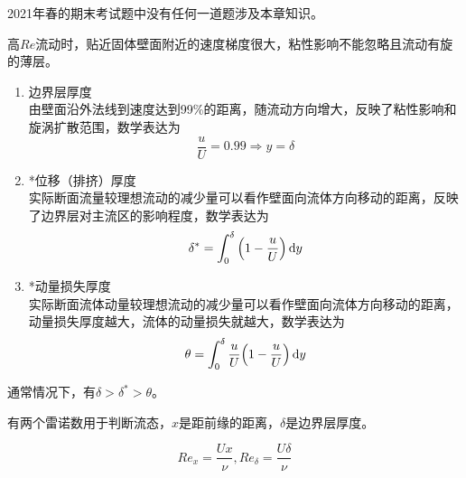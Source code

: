 
\begin{tip}
	2021年春的期末考试题中没有任何一道题涉及本章知识。
\end{tip}


\begin{definition}[边界层]
	高$Re$流动时，贴近固体壁面附近的速度梯度很大，粘性影响不能忽略且流动有旋的薄层。
\end{definition}


\begin{enumerate}
	\item 边界层厚度\\
	由壁面沿外法线到速度达到99\%的距离，随流动方向增大，反映了粘性影响和旋涡扩散范围，数学表达为
	\begin{equation}
		\dfrac{u}{U} = 0.99 \Rightarrow y = \delta
	\end{equation}
    \item *位移（排挤）厚度\\
    实际断面流量较理想流动的减少量可以看作壁面向流体方向移动的距离，反映了边界层对主流区的影响程度，数学表达为
    \begin{equation}
    	\delta^{*} = \int_{0}^{\delta} \qty(1 - \dfrac{u}{U}) \dd{y}
    \end{equation}
    \item *动量损失厚度\\
    实际断面流体动量较理想流动的减少量可以看作壁面向流体方向移动的距离，动量损失厚度越大，流体的动量损失就越大，数学表达为
    \begin{equation}
    	\theta = \int_{0}^{\delta} \dfrac{u}{U}\qty(1 - \dfrac{u}{U}) \dd{y}
    \end{equation}
\end{enumerate}

通常情况下，有$\delta > \delta^{*} > \theta$。



有两个雷诺数用于判断流态，$x$是距前缘的距离，$\delta$是边界层厚度。

\begin{equation*}
	Re_{x} = \dfrac{Ux}{\nu}, Re_{\delta} = \dfrac{U\delta}{\nu}
\end{equation*}


